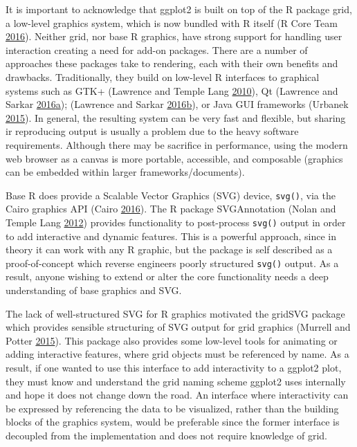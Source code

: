\documentclass[12pt,]{isuthesis}
\begin{document}
It is important to acknowledge that ggplot2 is built on top of the R
package grid, a low-level graphics system, which is now bundled with R
itself (R Core Team \protect\hyperlink{ref-RCore}{2016}). Neither grid,
nor base R graphics, have strong support for handling user interaction
creating a need for add-on packages. There are a number of approaches
these packages take to rendering, each with their own benefits and
drawbacks. Traditionally, they build on low-level R interfaces to
graphical systems such as GTK+ (Lawrence and Temple Lang
\protect\hyperlink{ref-RGtk2}{2010}), Qt (Lawrence and Sarkar
\protect\hyperlink{ref-qtbase}{2016}\protect\hyperlink{ref-qtbase}{a});
(Lawrence and Sarkar
\protect\hyperlink{ref-qtpaint}{2016}\protect\hyperlink{ref-qtpaint}{b}),
or Java GUI frameworks (Urbanek \protect\hyperlink{ref-rJava}{2015}). In
general, the resulting system can be very fast and flexible, but sharing
ir reproducing output is usually a problem due to the heavy software
requirements. Although there may be sacrifice in performance, using the
modern web browser as a canvas is more portable, accessible, and
composable (graphics can be embedded within larger
frameworks/documents).

Base R does provide a Scalable Vector Graphics (SVG) device,
\texttt{svg()}, via the Cairo graphics API (Cairo
\protect\hyperlink{ref-cairo}{2016}). The R package SVGAnnotation (Nolan
and Temple Lang \protect\hyperlink{ref-SVGAnnotation}{2012}) provides
functionality to post-process \texttt{svg()} output in order to add
interactive and dynamic features. This is a powerful approach, since in
theory it can work with any R graphic, but the package is self described
as a proof-of-concept which reverse engineers poorly structured
\texttt{svg()} output. As a result, anyone wishing to extend or alter
the core functionality needs a deep understanding of base graphics and
SVG.

The lack of well-structured SVG for R graphics motivated the gridSVG
package which provides sensible structuring of SVG output for grid
graphics (Murrell and Potter \protect\hyperlink{ref-gridSVG}{2015}).
This package also provides some low-level tools for animating or adding
interactive features, where grid objects must be referenced by name. As
a result, if one wanted to use this interface to add interactivity to a
ggplot2 plot, they must know and understand the grid naming scheme
ggplot2 uses internally and hope it does not change down the road. An
interface where interactivity can be expressed by referencing the data
to be visualized, rather than the building blocks of the graphics
system, would be preferable since the former interface is decoupled from
the implementation and does not require knowledge of grid.
\end{document}
